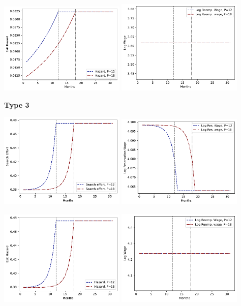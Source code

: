 \documentclass[letter, 10pt]{article}
\begin{document}
\includegraphics[clip=true,trim=0cm 0cm 0cm 0cm,width = 0.45\textwidth]{figures_Est1_compiled/fig_type2_hazard.pdf} 
\includegraphics[clip=true,trim=0cm 0cm 0cm 0cm,width = 0.45\textwidth]{figures_Est1_compiled/fig_type2_w.pdf} 

\pagebreak 
 \textbf{Type 3} 
 
\includegraphics[clip=true,trim=0cm 0cm 0cm 0cm,width = 0.45\textwidth]{figures_Est1_compiled/fig_type3_s.pdf} 
\includegraphics[clip=true,trim=0cm 0cm 0cm 0cm,width = 0.45\textwidth]{figures_Est1_compiled/fig_type3_phi.pdf} 

\includegraphics[clip=true,trim=0cm 0cm 0cm 0cm,width = 0.45\textwidth]{figures_Est1_compiled/fig_type3_hazard.pdf} 
\includegraphics[clip=true,trim=0cm 0cm 0cm 0cm,width = 0.45\textwidth]{figures_Est1_compiled/fig_type3_w.pdf} 
\end{document}
